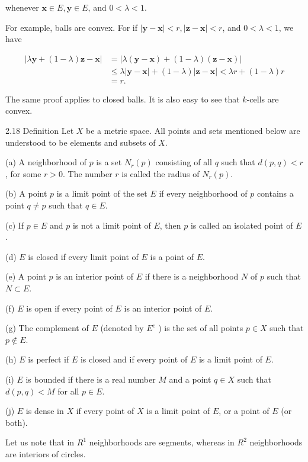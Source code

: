 \documentclass[10pt]{article}
\begin{document}
whenever $\mathbf{x} \in E, \mathbf{y} \in E$, and $0<\lambda<1$.

For example, balls are convex. For if $|\mathbf{y}-\mathbf{x}|<r,|\mathbf{z}-\mathbf{x}|<r$, and $0<\lambda<1$, we have

$$
\begin{aligned}
|\lambda \mathbf{y}+(1-\lambda) \mathbf{z}-\mathbf{x}| & =|\lambda(\mathbf{y}-\mathbf{x})+(1-\lambda)(\mathbf{z}-\mathbf{x})| \\
& \leq \lambda|\mathbf{y}-\mathbf{x}|+(1-\lambda)|\mathbf{z}-\mathbf{x}|<\lambda r+(1-\lambda) r \\
& =r .
\end{aligned}
$$

The same proof applies to closed balls. It is also easy to see that $k$-cells are convex.

2.18 Definition Let $X$ be a metric space. All points and sets mentioned below are understood to be elements and subsets of $X$.

(a) A neighborhood of $p$ is a set $N_{r}(p)$ consisting of all $q$ such that $d(p, q)<r$, for some $r>0$. The number $r$ is called the radius of $N_{r}(p)$.

(b) A point $p$ is a limit point of the set $E$ if every neighborhood of $p$ contains a point $q \neq p$ such that $q \in E$.

(c) If $p \in E$ and $p$ is not a limit point of $E$, then $p$ is called an isolated point of $E$.

(d) $E$ is closed if every limit point of $E$ is a point of $E$.

(e) A point $p$ is an interior point of $E$ if there is a neighborhood $N$ of $p$ such that $N \subset E$.

(f) $E$ is open if every point of $E$ is an interior point of $E$.

(g) The complement of $E$ (denoted by $E^{c}$ ) is the set of all points $p \in X$ such that $p \notin E$.

(h) $E$ is perfect if $E$ is closed and if every point of $E$ is a limit point of $E$.

(i) $E$ is bounded if there is a real number $M$ and a point $q \in X$ such that $d(p, q)<M$ for all $p \in E$.

(j) $E$ is dense in $X$ if every point of $X$ is a limit point of $E$, or a point of $E$ (or both).

Let us note that in $R^{1}$ neighborhoods are segments, whereas in $R^{2}$ neighborhoods are interiors of circles.
\end{document}
